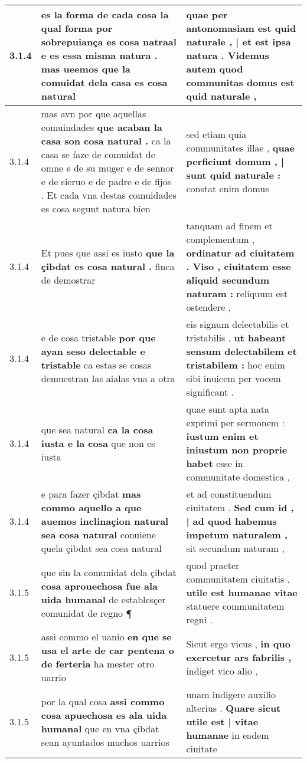 \begin{tabular}{|p{1cm}|p{6.5cm}|p{6.5cm}|}
3.1.4 & es la forma de cada cosa \textbf{ la qual forma por sobrepuiança es cosa natraal e es essa misma natura . } mas ueemos que la comuidat dela casa es cosa natural & quae per antonomasiam est \textbf{ quid naturale , | et est ipsa natura . } Videmus autem quod communitas domus est quid naturale , \\\hline
3.1.4 & mas avn por que aquellas comuindades \textbf{ que acaban la casa son cosa natural . } ca la casa se faze de comuidat de omne e de su muger e de sennor e de sieruo e de padre e de fijos . Et cada vna destas comuidades es cosa segunt natura bien & sed etiam quia communitates illae , \textbf{ quae perficiunt domum , | sunt quid naturale : } constat enim domus \\\hline
3.1.4 & Et pues que assi es iusto \textbf{ que la çibdat es cosa natural . } finca de demostrar & tanquam ad finem et complementum , \textbf{ ordinatur ad ciuitatem . Viso , ciuitatem esse aliquid secundum naturam : } reliquum est ostendere , \\\hline
3.1.4 & e de cosa tristable \textbf{ por que ayan seso delectable e tristable } ca estas se cosas demuestran las aialas vna a otra & eis signum delectabilis et tristabilis , \textbf{ ut habeant sensum delectabilem et tristabilem : } hoc enim sibi inuicem per vocem significant . \\\hline
3.1.4 & que sea natural \textbf{ ca la cosa iusta e la cosa } que non es iusta & quae sunt apta nata exprimi per sermonem : \textbf{ iustum enim et iniustum non proprie habet } esse in communitate domestica , \\\hline
3.1.4 & e para fazer çibdat \textbf{ mas commo aquello a que auemos inclinaçion natural sea cosa natural } conuiene quela çibdat sea cosa natural & et ad constituendum ciuitatem . \textbf{ Sed cum id , | ad quod habemus impetum naturalem , } sit secundum naturam , \\\hline
3.1.5 & que sin la comunidat dela çibdat \textbf{ cosa aprouechosa fue ala uida humanal } de establesçer comunidat de regno ¶ & quod praeter communitatem ciuitatis , \textbf{ utile est humanae vitae } statuere communitatem regni . \\\hline
3.1.5 & assi commo el uanio \textbf{ en que se usa el arte de car pentena o de ferteria } ha mester otro uarrio & Sicut ergo vicus , \textbf{ in quo exercetur ars fabrilis , } indiget vico alio , \\\hline
3.1.5 & por la qual cosa \textbf{ assi commo cosa apuechosa es ala uida humanal } que en vna çibdat sean ayuntados muchos uarrios & unam indigere auxilio alterius . \textbf{ Quare sicut utile est | vitae humanae } in eadem ciuitate \\\hline

\end{tabular}
